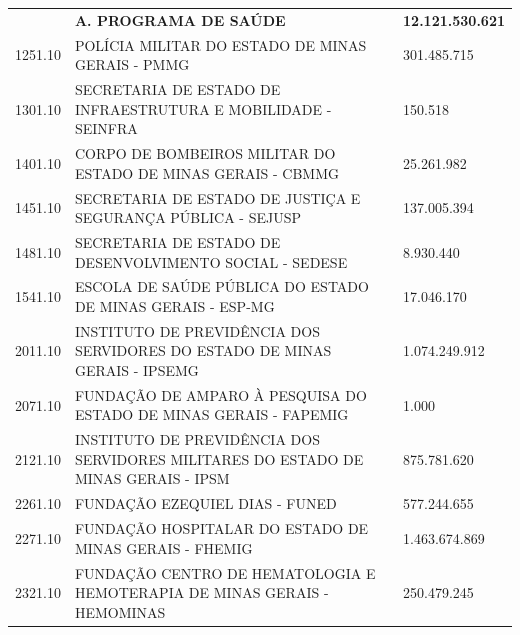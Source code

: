 \documentclass{article}
\begin{document}
\begin{longtable}[c]{m{3cm}|m{12cm}|m{3cm}}
\multicolumn{1}{C{3cm}|}{ \textbf{}} & \multicolumn{1}{L{12cm}|}{ \textbf{A. PROGRAMA DE SAÚDE}} & \multicolumn{1}{R{3cm}}{ \textbf{12.121.530.621}} \\
\multicolumn{1}{C{3cm}|}{1251.10} & \multicolumn{1}{L{12cm}|}{POLÍCIA MILITAR DO ESTADO DE MINAS GERAIS - PMMG} & \multicolumn{1}{R{3cm}}{301.485.715} \\
\multicolumn{1}{C{3cm}|}{1301.10} & \multicolumn{1}{L{12cm}|}{SECRETARIA DE ESTADO DE INFRAESTRUTURA E MOBILIDADE - SEINFRA} & \multicolumn{1}{R{3cm}}{150.518} \\
\multicolumn{1}{C{3cm}|}{1401.10} & \multicolumn{1}{L{12cm}|}{CORPO DE BOMBEIROS MILITAR DO ESTADO DE MINAS GERAIS - CBMMG} & \multicolumn{1}{R{3cm}}{25.261.982} \\
\multicolumn{1}{C{3cm}|}{1451.10} & \multicolumn{1}{L{12cm}|}{SECRETARIA DE ESTADO DE JUSTIÇA E SEGURANÇA PÚBLICA - SEJUSP} & \multicolumn{1}{R{3cm}}{137.005.394} \\
\multicolumn{1}{C{3cm}|}{1481.10} & \multicolumn{1}{L{12cm}|}{SECRETARIA DE ESTADO DE DESENVOLVIMENTO SOCIAL - SEDESE} & \multicolumn{1}{R{3cm}}{8.930.440} \\
\multicolumn{1}{C{3cm}|}{1541.10} & \multicolumn{1}{L{12cm}|}{ESCOLA DE SAÚDE PÚBLICA DO ESTADO DE MINAS GERAIS - ESP-MG} & \multicolumn{1}{R{3cm}}{17.046.170} \\
\multicolumn{1}{C{3cm}|}{2011.10} & \multicolumn{1}{L{12cm}|}{INSTITUTO DE PREVIDÊNCIA DOS SERVIDORES DO ESTADO DE MINAS GERAIS - IPSEMG} & \multicolumn{1}{R{3cm}}{1.074.249.912} \\
\multicolumn{1}{C{3cm}|}{2071.10} & \multicolumn{1}{L{12cm}|}{FUNDAÇÃO DE AMPARO À PESQUISA DO ESTADO DE MINAS GERAIS - FAPEMIG} & \multicolumn{1}{R{3cm}}{1.000} \\
\multicolumn{1}{C{3cm}|}{2121.10} & \multicolumn{1}{L{12cm}|}{INSTITUTO DE PREVIDÊNCIA DOS SERVIDORES MILITARES DO ESTADO DE MINAS GERAIS - IPSM} & \multicolumn{1}{R{3cm}}{875.781.620} \\
\multicolumn{1}{C{3cm}|}{2261.10} & \multicolumn{1}{L{12cm}|}{FUNDAÇÃO EZEQUIEL DIAS - FUNED} & \multicolumn{1}{R{3cm}}{577.244.655} \\
\multicolumn{1}{C{3cm}|}{2271.10} & \multicolumn{1}{L{12cm}|}{FUNDAÇÃO HOSPITALAR DO ESTADO DE MINAS GERAIS - FHEMIG} & \multicolumn{1}{R{3cm}}{1.463.674.869} \\
\multicolumn{1}{C{3cm}|}{2321.10} & \multicolumn{1}{L{12cm}|}{FUNDAÇÃO CENTRO DE HEMATOLOGIA E HEMOTERAPIA DE MINAS GERAIS - HEMOMINAS} & \multicolumn{1}{R{3cm}}{250.479.245} \\

\end{longtable}
\end{document}
